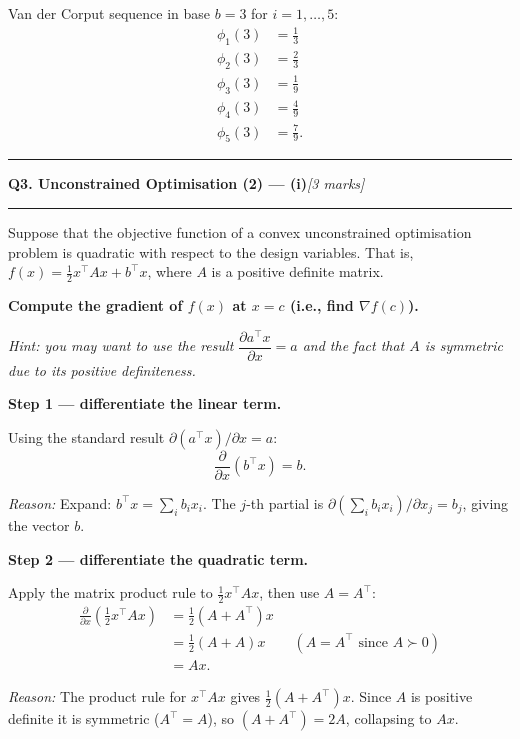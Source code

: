 \documentclass[10pt,a4paper]{article}
\newcommand{\sectitle}[2]{%
  \vspace{10pt}\noindent\rule{\linewidth}{0.8pt}\par\vspace{2pt}%
  {\large\textbf{#1}\hfill\normalsize\textit{[#2 marks]}}\par
  \vspace{2pt}\rule{\linewidth}{0.4pt}\vspace{4pt}}
\newcommand{\reason}[1]{%
  \begin{mdframed}[backgroundcolor=reasonbg, linewidth=0.4pt,
    innertopmargin=3pt, innerbottommargin=3pt,
    innerleftmargin=6pt, innerrightmargin=6pt]
    \small\textit{Reason:} \small #1
  \end{mdframed}\vspace{2pt}}
\newenvironment{resultbox}{%
  \begin{mdframed}[backgroundcolor=boxbg, linewidth=0.6pt,
    innertopmargin=5pt, innerbottommargin=5pt,
    innerleftmargin=8pt, innerrightmargin=8pt]
}{\end{mdframed}}
\begin{document}
\begin{resultbox}
Van der Corput sequence in base $b=3$ for $i=1,\ldots,5$:
\begin{align*}
  \phi_1(3) &= \tfrac{1}{3} \\
  \phi_2(3) &= \tfrac{2}{3} \\
  \phi_3(3) &= \tfrac{1}{9} \\
  \phi_4(3) &= \tfrac{4}{9} \\
  \phi_5(3) &= \tfrac{7}{9}.
\end{align*}
\end{resultbox}

\newpage
\sectitle{Q3. Unconstrained Optimisation (2) --- (i)}{3}

\noindent Suppose that the objective function of a convex unconstrained
optimisation problem is quadratic with respect to the design variables.
That is, $f(x) = \tfrac{1}{2}x^\top Ax + b^\top x$, where $A$ is a
positive definite matrix.

\textbf{Compute the gradient of $f(x)$ at $x = c$ (i.e., find $\nabla f(c)$).}

\textit{Hint: you may want to use the result $\dfrac{\partial a^\top x}{\partial x} = a$
and the fact that $A$ is symmetric due to its positive definiteness.}

\textbf{Step 1 --- differentiate the linear term.}

Using the standard result $\partial(a^\top x)/\partial x = a$:
\[
  \frac{\partial}{\partial x}(b^\top x) = b.
\]

\reason{Expand: $b^\top x = \sum_i b_i x_i$. The $j$-th partial is
        $\partial(\sum_i b_i x_i)/\partial x_j = b_j$, giving the vector $b$.}

\textbf{Step 2 --- differentiate the quadratic term.}

Apply the matrix product rule to $\tfrac{1}{2}x^\top A x$, then use $A = A^\top$:
\begin{align*}
  \frac{\partial}{\partial x}\!\left(\tfrac{1}{2}x^\top Ax\right)
    &= \tfrac{1}{2}(A + A^\top)x \\
    &= \tfrac{1}{2}(A + A)x \qquad (A = A^\top\text{ since }A\succ 0) \\
    &= Ax.
\end{align*}

\reason{The product rule for $x^\top Ax$ gives $\tfrac{1}{2}(A+A^\top)x$.
        Since $A$ is positive definite it is symmetric ($A^\top=A$),
        so $(A+A^\top)=2A$, collapsing to $Ax$.}
\end{document}
